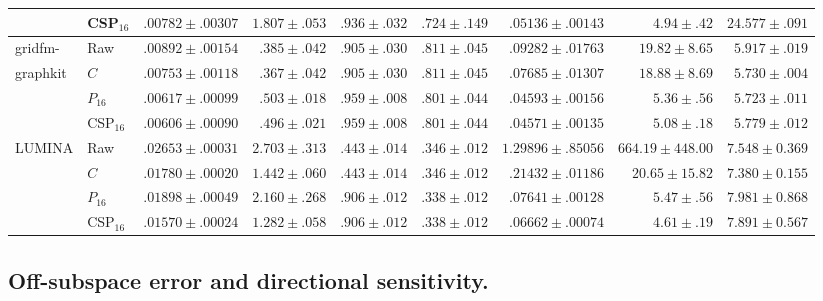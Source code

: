 \documentclass{article}
\begin{document}
\begin{table}[t]
\begin{tabular}{llrrrrrrr}
& CSP$_{16}$
& $\mathbf{.00782{\pm}.00307}$
& $1.807{\pm}.053$
& $\mathbf{.936{\pm}.032}$
& $.724{\pm}.149$
& $\mathbf{.05136{\pm}.00143}$
& $\mathbf{4.94{\pm}.42}$
& $24.577{\pm}.091$ \\

\midrule
gridfm-
& Raw
& $.00892{\pm}.00154$
& $.385{\pm}.042$
& $.905{\pm}.030$
& $.811{\pm}.045$
& $.09282{\pm}.01763$
& $19.82{\pm}8.65$
& $5.917{\pm}.019$ \\
graphkit

& $C$
& $.00753{\pm}.00118$
& $\mathbf{.367{\pm}.042}$
& $.905{\pm}.030$
& $.811{\pm}.045$
& $.07685{\pm}.01307$
& $18.88{\pm}8.69$
& $5.730{\pm}.004$ \\

& $P_{16}$
& $.00617{\pm}.00099$
& $.503{\pm}.018$
& $\mathbf{.959{\pm}.008}$
& $.801{\pm}.044$
& $.04593{\pm}.00156$
& $5.36{\pm}.56$
& $5.723{\pm}.011$ \\

& CSP$_{16}$
& $\mathbf{.00606{\pm}.00090}$
& $.496{\pm}.021$
& $\mathbf{.959{\pm}.008}$
& $.801{\pm}.044$
& $\mathbf{.04571{\pm}.00135}$
& $\mathbf{5.08{\pm}.18}$
& $5.779{\pm}.012$ \\

\midrule
LUMINA
& Raw
& $.02653{\pm}.00031$
& $2.703{\pm}.313$
& $.443{\pm}.014$
& $.346{\pm}.012$
& $1.29896{\pm}.85056$
& $664.19{\pm}448.00$
& $7.548{\pm}0.369$ \\

& $C$
& $.01780{\pm}.00020$
& $1.442{\pm}.060$
& $.443{\pm}.014$
& $.346{\pm}.012$
& $.21432{\pm}.01186$
& $20.65{\pm}15.82$
& $7.380{\pm}0.155$ \\

& $P_{16}$
& $.01898{\pm}.00049$
& $2.160{\pm}.268$
& $\mathbf{.906{\pm}.012}$
& $.338{\pm}.012$
& $.07641{\pm}.00128$
& $5.47{\pm}.56$
& $7.981{\pm}0.868$ \\

& CSP$_{16}$
& $\mathbf{.01570{\pm}.00024}$
& $\mathbf{1.282{\pm}.058}$
& $\mathbf{.906{\pm}.012}$
& $.338{\pm}.012$
& $\mathbf{.06662{\pm}.00074}$
& $\mathbf{4.61{\pm}.19}$
& $7.891{\pm}0.567$ \\

\bottomrule
\end{tabular}
\end{table}


\subsection{Off-subspace error and directional sensitivity.}
\end{document}

